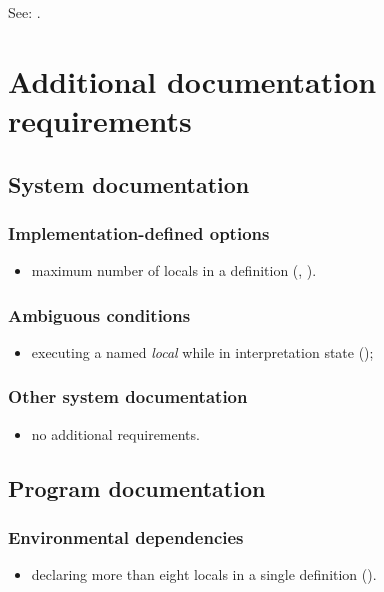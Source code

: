See: .


\section{Additional documentation requirements} %

\subsection{System documentation} %

\subsubsection{Implementation-defined options} %
\begin{itemize}
\item maximum number of locals in a definition
	(,
	 ).
\end{itemize}

\subsubsection{Ambiguous conditions} %
\begin{itemize}
\item executing a named \emph{local} while in interpretation state
	();
\end{itemize}

\subsubsection{Other system documentation} %
\begin{itemize}
\item no additional requirements.
\end{itemize}

\subsection{Program documentation} %

\subsubsection{Environmental dependencies} %
\begin{itemize}
\item declaring more than eight locals in a single definition
	().
\end{itemize}

